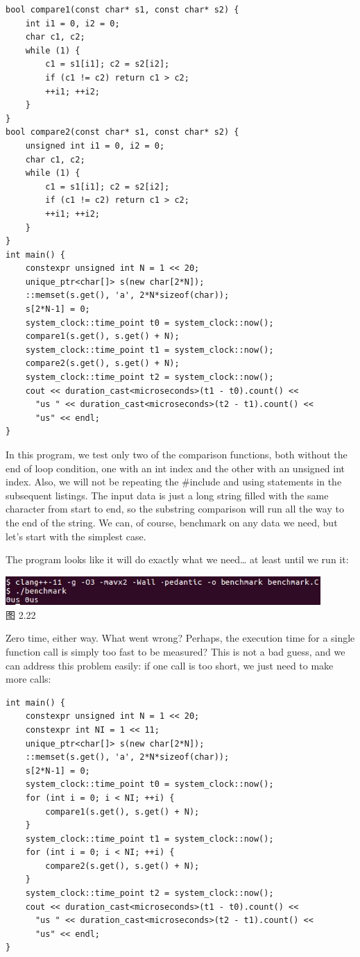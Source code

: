 \begin{lstlisting}[style=styleCXX]
bool compare1(const char* s1, const char* s2) {
	int i1 = 0, i2 = 0;
	char c1, c2;
	while (1) {
		c1 = s1[i1]; c2 = s2[i2];
		if (c1 != c2) return c1 > c2;
		++i1; ++i2;
	}
}
bool compare2(const char* s1, const char* s2) {
	unsigned int i1 = 0, i2 = 0;
	char c1, c2;
	while (1) {
		c1 = s1[i1]; c2 = s2[i2];
		if (c1 != c2) return c1 > c2;
		++i1; ++i2;
	}
}
int main() {
	constexpr unsigned int N = 1 << 20;
	unique_ptr<char[]> s(new char[2*N]);
	::memset(s.get(), 'a', 2*N*sizeof(char));
	s[2*N-1] = 0;
	system_clock::time_point t0 = system_clock::now();
	compare1(s.get(), s.get() + N);
	system_clock::time_point t1 = system_clock::now();
	compare2(s.get(), s.get() + N);
	system_clock::time_point t2 = system_clock::now();
	cout << duration_cast<microseconds>(t1 - t0).count() <<
	  "us " << duration_cast<microseconds>(t2 - t1).count() <<
	  "us" << endl;
}
\end{lstlisting}

In this program, we test only two of the comparison functions, both without the end of loop condition, one with an int index and the other with an unsigned int index. Also, we will not be repeating the \#include and using statements in the subsequent listings. The input data is just a long string filled with the same character from start to end, so the substring comparison will run all the way to the end of the string. We can, of course, benchmark on any data we need, but let's start with the simplest case.

The program looks like it will do exactly what we need… at least until we run it:

\begin{center}
\includegraphics[width=0.9\textwidth]{content/1/chapter2/images/22.jpg}\\
图 2.22
\end{center}

Zero time, either way. What went wrong? Perhaps, the execution time for a single function call is simply too fast to be measured? This is not a bad guess, and we can address this problem easily: if one call is too short, we just need to make more calls:

\begin{lstlisting}[style=styleCXX]
int main() {
	constexpr unsigned int N = 1 << 20;
	constexpr int NI = 1 << 11;
	unique_ptr<char[]> s(new char[2*N]);
	::memset(s.get(), 'a', 2*N*sizeof(char));
	s[2*N-1] = 0;
	system_clock::time_point t0 = system_clock::now();
	for (int i = 0; i < NI; ++i) {
		compare1(s.get(), s.get() + N);
	}
	system_clock::time_point t1 = system_clock::now();
	for (int i = 0; i < NI; ++i) {
		compare2(s.get(), s.get() + N);
	}
	system_clock::time_point t2 = system_clock::now();
	cout << duration_cast<microseconds>(t1 - t0).count() <<
	  "us " << duration_cast<microseconds>(t2 - t1).count() <<
	  "us" << endl;
}
\end{lstlisting}

